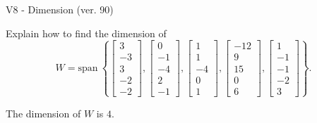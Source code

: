 \begin{exercise}
  \begin{exerciseTitle}V8 - Dimension (ver. 90)\end{exerciseTitle}
  \begin{exerciseStatement}
    Explain how to find the dimension of 
\[W=\mathrm{span}\ \left\{\left[\begin{array}{r}
3 \\
-3 \\
3 \\
-2 \\
-2
\end{array}\right] , \left[\begin{array}{r}
0 \\
-1 \\
-4 \\
2 \\
-1
\end{array}\right] , \left[\begin{array}{r}
1 \\
1 \\
-4 \\
0 \\
1
\end{array}\right] , \left[\begin{array}{r}
-12 \\
9 \\
15 \\
0 \\
6
\end{array}\right] , \left[\begin{array}{r}
1 \\
-1 \\
-1 \\
-2 \\
3
\end{array}\right]\right\}.\]



  \end{exerciseStatement}
  \begin{exerciseAnswer}
   The dimension of \(W\) is  \(4\).
  


  \end{exerciseAnswer}
\end{exercise}